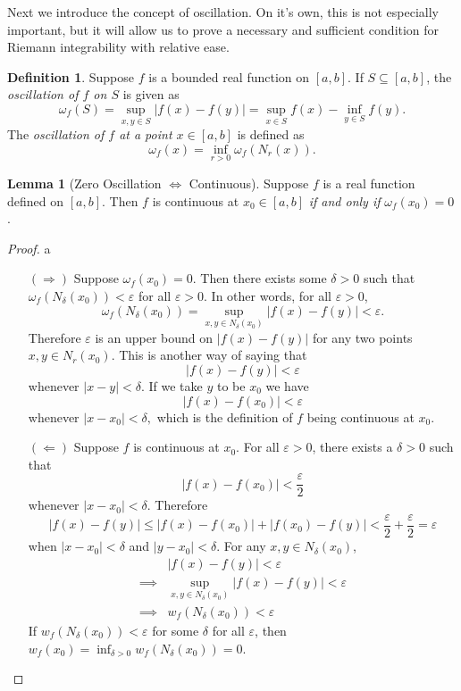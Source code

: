 \documentclass{article}
\newcommand{\abs}[1]{\left\lvert#1\right\rvert}
\theoremstyle{definition}
\newtheorem{lemma}{Lemma}[section]
\newtheorem{definition}{Definition}[section]
\begin{document}
	Next we introduce the concept of oscillation. On it's own, this is not especially important, but it will allow us to prove a necessary and sufficient condition for Riemann integrability with relative ease.
	\begin{definition}
		Suppose $ f $ is a bounded real function on $ [a,b] $. If $ S\subseteq [a,b] $, the \textit{\color{red}oscillation of $ f $ on $ S $} is given as 
		$$ \omega_f(S)= \sup_{x,y\in S}\abs{f(x)-f(y)} = \sup_{x\in S} f(x) - \inf_{y\in S}f(y).$$ The \textit{\color{red}oscillation of $ f $ at a point $ x\in [a,b] $} is defined as 
		$$ \omega_f(x)=\inf_{r > 0}\omega_f\left(N_r(x)\right) .$$
	\end{definition} 
	\begin{lemma}[Zero Oscillation $ \iff $ Continuous]
		Suppose $ f $ is a real function defined on $ [a,b] $. Then $ f $ is continuous at $ x_0\in [a,b] $ \textit{if and only if} $ \omega_f(x_0)=0 $.
	\end{lemma} 
	\begin{proof}
		{\color{white}a}
		\begin{enumerate}
			\item [$ (\Longrightarrow) $] Suppose $ \omega_f(x_0)=0 $. Then there exists some $ \delta >0 $ such that $\omega_f(N_\delta(x_0))<\varepsilon $ for all $ \varepsilon > 0 $. In other words, for all $ \varepsilon >0 $, 
			$$ \omega_f(N_\delta(x_0)) = \sup_{x,y\in N_\delta(x_0)}\abs{f(x)-f(y)} <\varepsilon .$$ Therefore $ \varepsilon $ is an upper bound on $ \abs{f(x)-f(y)} $ for any two points $ {x,y\in N_r(x_0)} $. This is another way of saying that $$ \abs{f(x)-f(y)} <\varepsilon $$ whenever $ \abs{x-y}<\delta $. If we take $ y $ to be $ x_0 $ we have $$ \abs{f(x)-f(x_0)} <\varepsilon $$ whenever $ \abs{x-x_0}<\delta ,$ which is the definition of $ f $ being continuous at $ x_0 $. 
			\item [$ (\Longleftarrow) $] Suppose $ f $ is continuous at $ x_0 $. For all $ \varepsilon >0 $, there exists a $ \delta>0 $ such that 
			$$ \abs{f(x)-f(x_0)} <\frac{\varepsilon}{2} $$  whenever $  \abs{x-x_0}<\delta $. Therefore 
			$$ \abs{f(x)-f(y)} \le \abs{f(x)-f(x_0)} + \abs{f(x_0)-f(y)} < \frac{\varepsilon}{2} + \frac{\varepsilon}{2} = \varepsilon$$ when
			$\abs{x-x_0}<\delta $ and $ \abs{y-x_0}<\delta $. 
			For any $x,y\in N_\delta(x_0) $, 
			\begin{align*}
				&\abs{f(x)-f(y)} < \varepsilon \\
				\implies & \sup_{x,y\in N_\delta(x_0)}\abs{f(x)-f(y)} <\varepsilon \\ \implies & w_f(N_\delta(x_0))<\varepsilon 
			\end{align*}
			If $ w_f(N_\delta(x_0))<\varepsilon  $ for some $ \delta $ for all $ \varepsilon $, then $ w_f(x_0)=\inf_{\delta > 0}w_f(N_\delta(x_0))=0 $. 
		\end{enumerate}
	\end{proof}
\end{document}
